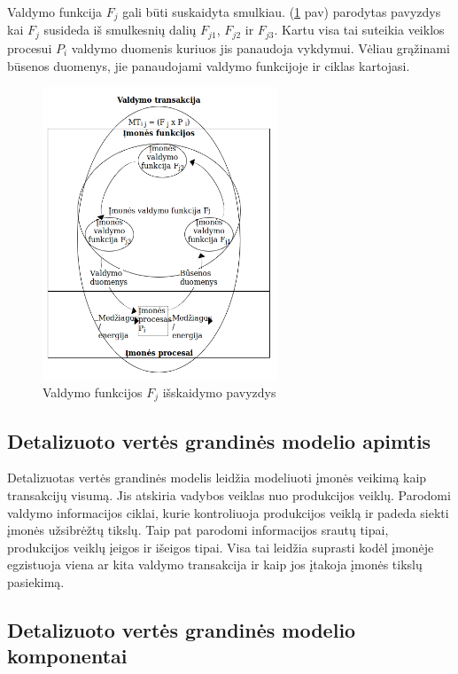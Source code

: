 Valdymo funkcija $F_j$ gali būti suskaidyta smulkiau. (\ref{img:splitted_management_function} pav) parodytas pavyzdys kai $F_j$ susideda iš smulkesnių dalių $F_{j1}$, $F_{j2}$ ir $F_{j3}$. Kartu visa tai suteikia veiklos procesui $P_i$ valdymo duomenis kuriuos jis panaudoja vykdymui. Vėliau grąžinami būsenos duomenys, jie panaudojami valdymo funkcijoje ir ciklas kartojasi.

\begin{figure}[H]
	\centering
	\includegraphics[width=7cm]{img/splitted_management_function}
	\caption{Valdymo funkcijos $F_j$ išskaidymo pavyzdys}
	\label{img:splitted_management_function}
\end{figure} 


\subsection{Detalizuoto vertės grandinės modelio apimtis}

Detalizuotas vertės grandinės modelis leidžia modeliuoti įmonės veikimą kaip transakcijų visumą. Jis atskiria vadybos veiklas nuo produkcijos veiklų. Parodomi valdymo informacijos ciklai, kurie kontroliuoja produkcijos veiklą ir padeda siekti įmonės užsibrėžtų tikslų. Taip pat parodomi informacijos srautų tipai, produkcijos veiklų įeigos ir išeigos tipai. Visa tai leidžia suprasti kodėl įmonėje egzistuoja viena ar kita valdymo transakcija ir kaip jos įtakoja įmonės tikslų pasiekimą.

\subsection{Detalizuoto vertės grandinės modelio komponentai}

